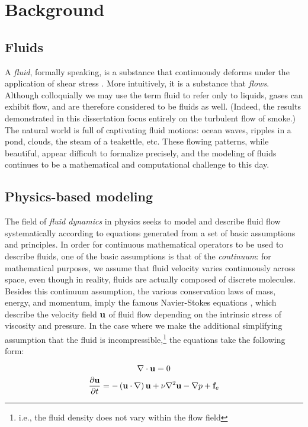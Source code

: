 \chapter[Background]{Background}
\label{chap:chap3}
\section{Fluids}

A {\em fluid}, formally speaking, is a substance that continuously deforms under the application of shear stress \cite{batchelor2000introduction}. More intuitively, it is a substance that {\em flows}. Although colloquially we may use the term fluid to refer only to liquids, gases can exhibit flow, and are therefore considered to be fluids as well. (Indeed, the results demonstrated in this dissertation focus entirely on the turbulent flow of smoke.) The natural world is full of captivating fluid motions: ocean waves, ripples in a pond, clouds, the steam of a teakettle, etc. These flowing patterns, while beautiful, appear difficult to formalize precisely, and the modeling of fluids continues to be a mathematical and computational challenge to this day.

\section{Physics-based modeling}
The field of {\em fluid dynamics} in physics seeks to model and describe fluid flow systematically according to equations generated from a set of basic assumptions and principles. In order for continuous mathematical operators to be used to describe fluids, one of the basic assumptions is that of the {\em continuum}: for mathematical purposes, we assume that fluid velocity varies continuously across space, even though in reality, fluids are actually composed of discrete molecules. Besides this continuum assumption, the various conservation laws of mass, energy, and momentum, imply the famous Navier-Stokes equations \cite{currie2012fundamental}, which describe the velocity field $\mathbf{u}$ of fluid flow depending on the intrinsic stress of viscosity and pressure. In the case where we make the additional simplifying assumption that the fluid is incompressible,\footnote{i.e., the fluid density does not vary within the flow field} the equations take the following form:

\begin{equation}
\label{eq:incompress}
\nabla \cdot \mathbf{u} = 0
\end{equation}
\begin{equation}
\label{eq:momentum}
\frac{\partial \mathbf{u}}{\partial t} = -\left(\mathbf{u} \cdot \nabla \right)\mathbf{u} + \nu \nabla^{2}\mathbf{u} - \nabla{p} + \mathbf{f}_e
\end{equation}

